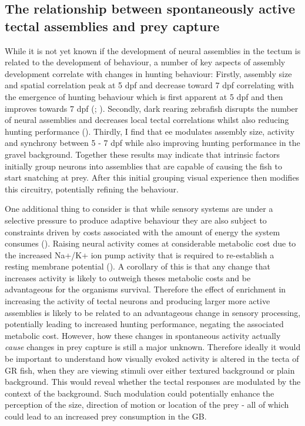 \subsection{The relationship between spontaneously active tectal assemblies and prey capture}
While it is not yet known if the development of neural assemblies in the tectum is related to the development of behaviour, a number of key aspects of assembly development correlate with changes in hunting behaviour: Firstly, assembly size and spatial correlation peak at 5 \gls{dpf} and decrease toward 7 \gls{dpf} correlating with the emergence of hunting behaviour which is first apparent at 5 \gls{dpf} and then improves towards 7 \gls{dpf} (\cite{Avitan2017}; \cite{Avitan2019}). Secondly, dark rearing zebrafish disrupts the number of neural assemblies and decreases local tectal correlations whilst also reducing hunting performance (\cite{Avitan2017}). Thirdly, I find that \gls{ee} modulates assembly size, activity and synchrony between 5 - 7 \gls{dpf} while also improving hunting performance in the gravel background. Together these results may indicate that intrinsic factors initially group neurons into assemblies that are capable of causing the fish to start snatching at prey. After this initial grouping visual experience then modifies this circuitry, potentially refining the behaviour. 

One additional thing to consider is that while sensory systems are under a selective pressure to produce adaptive behaviour they are also subject to constraints driven by costs associated with the amount of energy the system consumes (\cite{Nevin2010}). Raising neural activity comes at considerable metabolic cost due to the increased Na+/K+ ion pump activity that is required to re-establish a resting membrane potential (\cite{Niven2007FlyCoding}). A corollary of this is that any change that increases activity is likely to outweigh theses metabolic costs and be advantageous for the organisms survival. Therefore the effect of enrichment in increasing the activity of tectal neurons and producing larger more active assemblies is likely to be related to an advantageous change in sensory processing, potentially leading to increased hunting performance, negating the associated metabolic cost.  However, how these changes in spontaneous activity actually \textit{cause} changes in prey capture is still a major unknown. Therefore ideally it would be important to understand how visually evoked activity is altered in the tecta of GR fish, when they are viewing stimuli over either textured background or plain background. This would reveal whether the tectal responses are modulated by the context of the background. Such modulation could potentially enhance the perception of the size, direction of motion or location of the prey - all of which could lead to an increased prey consumption in the GB.

